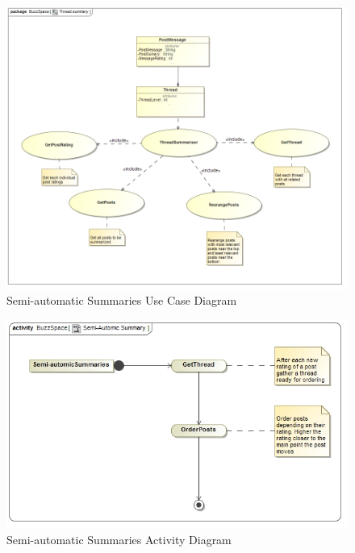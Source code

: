 \documentclass[11pt]{article}
\begin{document}
\begin{enumerate}
\begin{itemize}
		\begin{figure}[H]	
			\includegraphics[scale=0.5]{B3UseCase.png}
			\caption{Semi-automatic Summaries Use Case Diagram}
		\end{figure}
			 	  		
		\begin{figure}[H]	
			\includegraphics[scale=0.5]{B3Activity.png}
			\caption{Semi-automatic Summaries Activity Diagram}
		\end{figure}
			 	  					 	  		

	\newpage
			
			 
				
\end{itemize}	

\newpage




\end{enumerate}
\end{document}
